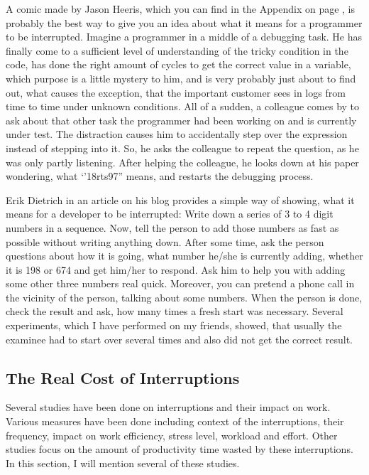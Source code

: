 \documentclass[11pt,singleside]{myfithesis2}
\begin{document}
A comic made by Jason Heeris, which you can find in the Appendix on page \pageref{app:programmer},  is probably the best way to give you an idea about what it means for a programmer to be interrupted. Imagine a programmer in a middle of a debugging task. He has finally come to a sufficient level of understanding of the tricky condition in the code, has done the right amount of cycles to get the correct value in a variable, which purpose is a little mystery to him, and is very probably just about to find out, what causes the exception, that the important customer sees in logs from time to time under unknown conditions. All of a sudden, a colleague comes by to ask about that other task the programmer had been working on and is currently under test. The distraction causes him to accidentally step over the expression instead of stepping into it. So, he asks the colleague to repeat the question, as he was only partly listening. After helping the colleague, he looks down at his paper wondering, what `'18rts97'' means, and restarts the debugging process.

Erik Dietrich in an article on his blog \cite{costOfInterruptions} provides a simple way of showing, what it means for a developer to be interrupted:\newline
Write down a series of 3 to 4 digit numbers in a sequence. Now, tell the person to add those numbers as fast as possible without writing anything down. After some time, ask the person questions about how it is going, what number he/she is currently adding, whether it is 198 or 674 and get him/her to respond. Ask him to help you with adding some other three numbers real quick. Moreover, you can pretend a phone call in the vicinity of the person, talking about some numbers. When the person is done, check the result and ask, how many times a fresh start was necessary. Several experiments, which I have performed on my friends, showed, that usually the examinee had to start over several times and also did not get the correct result.

		\subsection{The Real Cost of Interruptions }
Several studies have been done on interruptions and their impact on work. Various measures have been done including context of the interruptions, their frequency, impact on work efficiency, stress level, workload and effort. Other studies focus on the amount of productivity time wasted by these interruptions. In this section, I will mention several of these studies.
\end{document}
